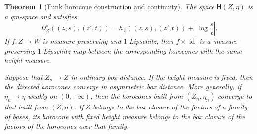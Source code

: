 \documentclass{amsart}
\numberwithin{equation}{section}
\theoremstyle{plain}
\newtheorem{theorem}{Theorem}[section]
\theoremstyle{definition}
\theoremstyle{remark}
\begin{document}
\begin{theorem}[Funk horocone construction and continuity]\label{thm:general-horocone}
The space $\mathsf H(Z,\eta)$ is a qm-space and satisfies
\begin{equation}\label{eq:general-horocone-symmetrization} D_Z^{\mathrm s}((z,s),(z',t)) =h_Z((z,s),(z',t))+\left|\log\frac{s}{t}\right|. \end{equation}
If $f\colon Z\to W$ is measure preserving and $1$-Lipschitz, then $f\times\operatorname{id}$ is a measure-preserving $1$-Lipschitz map between the corresponding horocones with the same height measure.

Suppose that $Z_n\to Z$ in ordinary box distance.  If the height measure is fixed, then the directed horocones converge in asymmetric box distance.  More generally, if $\eta_n\longrightarrow\eta$ weakly on $(0,+\infty)$, then the horocones built from $(Z_n,\eta_n)$ converge to that built from $(Z,\eta)$.  If $Z$ belongs to the box closure of the factors of a family of bases, its horocone with fixed height measure belongs to the box closure of the factors of the horocones over that family.
\end{theorem}
\end{document}
